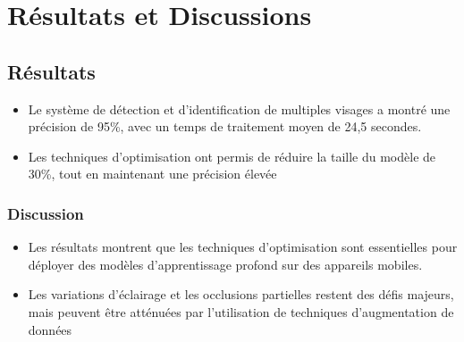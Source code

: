 \chapter{Résultats et Discussions}


\begin{onehalfspace}

\section{Résultats}

\begin{itemize}
\item Le système de détection et d'identification de multiples visages a montré une précision de 95\%, avec un temps de traitement moyen de 24,5 secondes.
\item Les techniques d'optimisation ont permis de réduire la taille du modèle de 30\%, tout en maintenant une précision élevée
\end{itemize}

\subsection{Discussion}

\begin{itemize}
\item Les résultats montrent que les techniques d'optimisation sont essentielles pour déployer des modèles d'apprentissage profond sur des appareils mobiles.
\item Les variations d'éclairage et les occlusions partielles restent des défis majeurs, mais peuvent être atténuées par l'utilisation de techniques d'augmentation de données
\end{itemize}



 
\end{onehalfspace}

